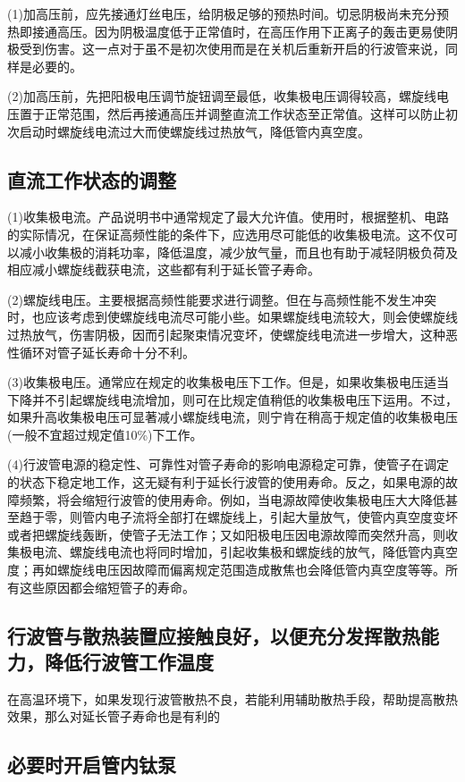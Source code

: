 (1)加高压前，应先接通灯丝电压，给阴极足够的预热时间。切忌阴极尚未充分预热即接通高压。因为阴极温度低于正常值时，在高压作用下正离子的轰击更易使阴极受到伤害。这一点对于虽不是初次使用而是在关机后重新开启的行波管来说，同样是必要的。

(2)加高压前，先把阳极电压调节旋钮调至最低，收集极电压调得较高，螺旋线电压置于正常范围，然后再接通高压并调整直流工作状态至正常值。这样可以防止初次启动时螺旋线电流过大而使螺旋线过热放气，降低管内真空度。
\subsection{直流工作状态的调整}
(1)收集极电流。产品说明书中通常规定了最大允许值。使用时，根据整机、电路的实际情况，在保证高频性能的条件下，应选用尽可能低的收集极电流。这不仅可以减小收集极的消耗功率，降低温度，减少放气量，而且也有助于减轻阴极负荷及相应减小螺旋线截获电流，这些都有利于延长管子寿命。

(2)螺旋线电压。主要根据高频性能要求进行调整。但在与高频性能不发生冲突时，也应该考虑到使螺旋线电流尽可能小些。如果螺旋线电流较大，则会使螺旋线过热放气，伤害阴极，因而引起聚束情况变坏，使螺旋线电流进一步增大，这种恶性循环对管子延长寿命十分不利。

(3)收集极电压。通常应在规定的收集极电压下工作。但是，如果收集极电压适当下降并不引起螺旋线电流增加，则可在比规定值稍低的收集极电压下运用。不过，如果升高收集极电压可显著减小螺旋线电流，则宁肯在稍高于规定值的收集极电压(一般不宜超过规定值10\%)下工作。

(4)行波管电源的稳定性、可靠性对管子寿命的影响电源稳定可靠，使管子在调定的状态下稳定地工作，这无疑有利于延长行波管的使用寿命。反之，如果电源的故障频繁，将会缩短行波管的使用寿命。例如，当电源故障使收集极电压大大降低甚至趋于零，则管内电子流将全部打在螺旋线上，引起大量放气，使管内真空度变坏或者把螺旋线轰断，使管子无法工作；又如阳极电压因电源故障而突然升高，则收集极电流、螺旋线电流也将同时增加，引起收集极和螺旋线的放气，降低管内真空度；再如螺旋线电压因故障而偏离规定范围造成散焦也会降低管内真空度等等。所有这些原因都会缩短管子的寿命。
\subsection{行波管与散热装置应接触良好，以便充分发挥散热能力，降低行波管工作温度}

在高温环境下，如果发现行波管散热不良，若能利用辅助散热手段，帮助提高散热效果，那么对延长管子寿命也是有利的

\subsection{必要时开启管内钛泵}

